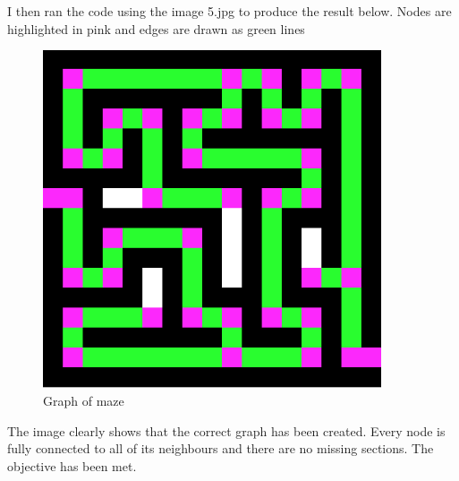 \documentclass[titlepage]{article}
\begin{document}
I then ran the code using the image 5.jpg to produce the result below. Nodes are highlighted in pink and edges are drawn as green lines

\begin{figure}[H]
  \centering
  \includegraphics[width=10cm]{grega.png}
  \caption{Graph of maze}
  \label{fig:dijk}
\end{figure}

The image clearly shows that the correct graph has been created. Every node is fully connected to all of its neighbours and there are no missing sections. The objective has been met.
\end{document}
